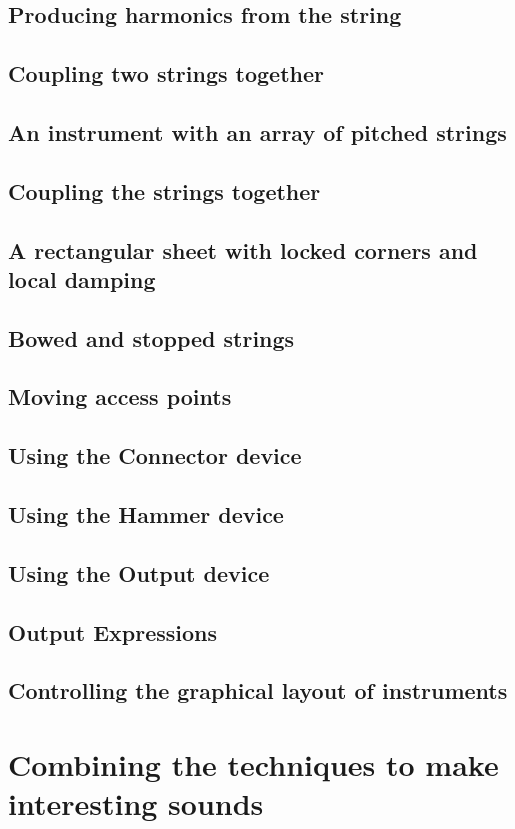 \subsection{Producing harmonics from the string}
\subsection{Coupling two strings together}
\subsection{An instrument with an array of pitched strings}
\subsection{Coupling the strings together}
\subsection{A rectangular sheet with locked corners and local damping}
\subsection{Bowed and stopped strings}
\subsection{Moving access points}
\subsection{Using the Connector device}
\subsection{Using the Hammer device}
\subsection{Using the Output device}
\subsection{Output Expressions}
\subsection{Controlling the graphical layout of instruments}

\section{Combining the techniques to make interesting sounds}
